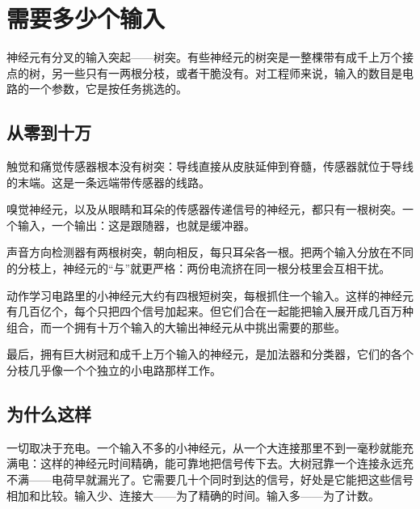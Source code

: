 \chapter{需要多少个输入}

神经元有分叉的输入突起——树突。有些神经元的树突是一整棵带有成千上万个接点的树，另一些只有一两根分枝，或者干脆没有。对工程师来说，输入的数目是电路的一个参数，它是按任务挑选的。

\section*{从零到十万}

触觉和痛觉传感器根本没有树突：导线直接从皮肤延伸到脊髓，传感器就位于导线的末端。这是一条远端带传感器的线路。


嗅觉神经元，以及从眼睛和耳朵的传感器传递信号的神经元，都只有一根树突。一个输入，一个输出：这是跟随器，也就是缓冲器。

声音方向检测器有两根树突，朝向相反，每只耳朵各一根。把两个输入分放在不同的分枝上，神经元的“与”就更严格：两份电流挤在同一根分枝里会互相干扰。

动作学习电路里的小神经元大约有四根短树突，每根抓住一个输入。这样的神经元有几百亿个，每个只把四个信号加起来。但它们合在一起能把输入展开成几百万种组合，而一个拥有十万个输入的大输出神经元从中挑出需要的那些。

最后，拥有巨大树冠和成千上万个输入的神经元，是加法器和分类器，它们的各个分枝几乎像一个个独立的小电路那样工作。

\section*{为什么这样}

一切取决于充电。一个输入不多的小神经元，从一个大连接那里不到一毫秒就能充满电：这样的神经元时间精确，能可靠地把信号传下去。大树冠靠一个连接永远充不满——电荷早就漏光了。它需要几十个同时到达的信号，好处是它能把这些信号相加和比较。输入少、连接大——为了精确的时间。输入多——为了计数。

